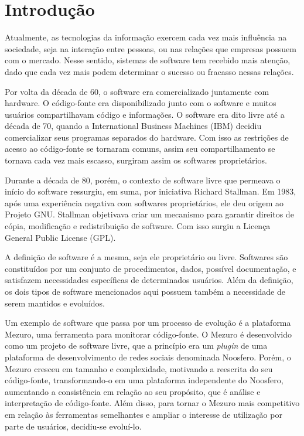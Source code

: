 \chapter{Introdução}
\label{cap-introducao}

Atualmente, as tecnologias da informação exercem cada vez mais influência na sociedade, seja na interação entre pessoas, ou nas relações que empresas possuem com o mercado. Nesse sentido, sistemas de software tem recebido mais atenção, dado que cada vez mais podem determinar o sucesso ou fracasso nessas relações.

Por volta da década de 60, o software era comercializado juntamente com hardware. O código-fonte era disponibilizado junto com o software e muitos usuários compartilhavam código e informações. O software era dito livre até a década de 70, quando a International Business Machines (IBM) decidiu comercializar seus programas separados do hardware. Com isso as restrições de acesso ao código-fonte se tornaram comuns, assim seu compartilhamento se tornava cada vez mais escasso, surgiram assim os softwares proprietários.

Durante a década de 80, porém, o contexto de software livre que permeava o início do software ressurgiu, em suma, por iniciativa Richard Stallman. Em 1983, após uma experiência negativa com softwares proprietários, ele deu origem ao Projeto GNU. Stallman objetivava criar um mecanismo para garantir direitos de cópia, modificação e redistribuição de software. Com isso surgiu a Licença General Public License (GPL).

A definição de software é a mesma, seja ele proprietário ou livre. Softwares são constituídos por um conjunto de procedimentos, dados, possível documentação, e satisfazem necessidades específicas de determinados usuários. Além da definição, os dois tipos de software mencionados aqui possuem também a necessidade de serem mantidos e evoluídos.

Um exemplo de software que passa por um processo de evolução é a plataforma Mezuro, uma ferramenta para monitorar código-fonte. O Mezuro é desenvolvido como um projeto de software livre, que a princípio era um \emph{plugin} de uma plataforma de desenvolvimento de redes sociais denominada Noosfero. Porém, o Mezuro cresceu em tamanho e complexidade, motivando a reescrita do seu código-fonte, transformando-o em uma plataforma independente do Noosfero, aumentando a consistência em relação ao seu propósito, que é análise e interpretação de código-fonte. Além disso,  para tornar o Mezuro mais competitivo em relação às ferramentas semelhantes e ampliar o interesse de utilização por parte de usuários, decidiu-se evoluí-lo.

